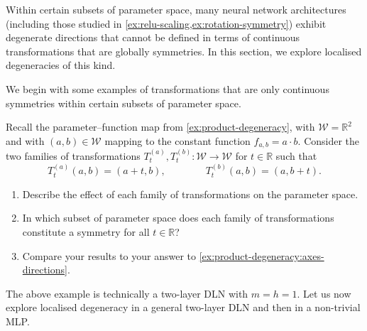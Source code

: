 \documentclass[11pt]{article}
\newcommand{\R}{\mathbb{R}}
\newcommand{\W}{\mathcal{W}}
\begin{document}
Within certain subsets of parameter space, many neural network architectures
(including those studied in
    \cref{ex:relu-scaling,ex:rotation-symmetry})
exhibit degenerate directions that cannot be defined in terms of
continuous transformations that are globally symmetries. In this section, we
explore localised degeneracies of this kind.

We begin with some examples of transformations that are only continuous
symmetries within certain subsets of parameter space.

\begin{exercise}
\label{ex:localised-symmetry}
    Recall the parameter--function map from \cref{ex:product-degeneracy},
    with $\W = \R^2$ and with $(a, b) \in \W$ mapping to the constant function
    $f_{a,b} = a \cdot b$.
    Consider the two families of transformations
    $T^{(a)}_t, T^{(b)}_t : \W \to \W$ for $t \in \R$ such that
        $$
        T^{(a)}_t(a, b) = (a + t, b),
        \qquad\qquad
        T^{(b)}_t(a, b) = (a, b + t)
        .
        $$
    \begin{enumerate}
        \item Describe the effect of each family of transformations on the
            parameter space.
        \item In which subset of parameter space does each family of
            transformations constitute a symmetry for all $t\in\R$?
        \item Compare your results to your answer to
            \cref{ex:product-degeneracy:axes-directions}.
    \end{enumerate}
\end{exercise}

The above example is technically a two-layer DLN with $m=h=1$. Let us now
explore localised degeneracy in a general two-layer DLN and then in a
non-trivial MLP.
\end{document}
